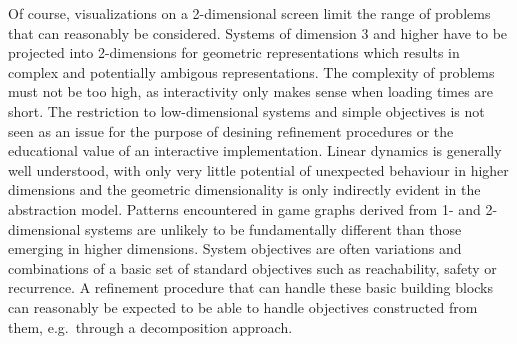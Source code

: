 Of course, visualizations on a 2-dimensional screen limit the range of problems that can reasonably be considered.
Systems of dimension 3 and higher have to be projected into 2-dimensions for geometric representations which results in complex and potentially ambigous representations.
The complexity of problems must not be too high, as interactivity only makes sense when loading times are short.
The restriction to low-dimensional systems and simple objectives is not seen as an issue for the purpose of desining refinement procedures or the educational value of an interactive implementation.
Linear dynamics is generally well understood, with only very little potential of unexpected behaviour in higher dimensions and the geometric dimensionality is only indirectly evident in the abstraction model.
Patterns encountered in game graphs derived from 1- and 2-dimensional systems are unlikely to be fundamentally different than those emerging in higher dimensions.
System objectives are often variations and combinations of a basic set of standard objectives such as reachability, safety or recurrence.
A refinement procedure that can handle these basic building blocks can reasonably be expected to be able to handle objectives constructed from them, e.g.\ through a decomposition approach.

